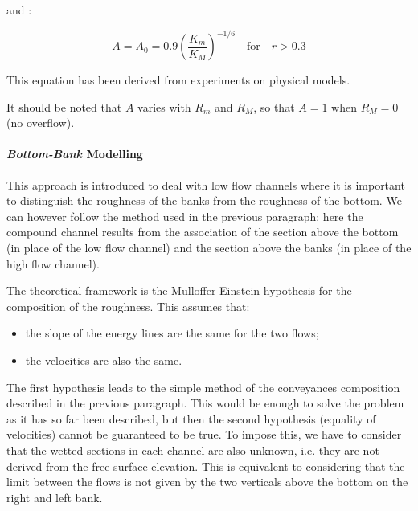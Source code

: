 and :

\begin{equation}
  A = A_0 = 0.9 \left ( \frac{K_m}{K_M} \right )^{-1/6} \quad \mbox{for} \quad r > 0.3
\end{equation}

\vspace{0.5cm}

This equation has been derived from experiments on physical models.

\vspace{0.5cm}

It should be noted that $A$ varies with $R_m$ and $R_M$, so that $A = 1$ when $R_M = 0$ (no overflow).

\paragraph{\emph{Bottom-Bank} Modelling\\}

\hspace*{1cm}

This approach is introduced to deal with low flow channels where it is important to distinguish the roughness of the banks from the roughness of the bottom. We can however follow the method used in the previous paragraph: here the compound channel results from the association of the section above the bottom (in place of the low flow channel) and the section above the banks (in place of the high flow channel).

\vspace{0.5cm}

The theoretical framework is the Mulloffer-Einstein hypothesis \cite{NICOLLET79} for the composition of the roughness. This assumes that:
\begin{itemize}
 \item the slope of the energy lines are the same for the two flows;
 \item the velocities are also the same.
\end{itemize}

\vspace{0.5cm}

The first hypothesis leads to the simple method of the conveyances composition described in the previous paragraph. This would be enough to solve the problem as it has so far been described, but then the second hypothesis (equality of velocities) cannot be guaranteed to be true. To impose this, we have to consider that the wetted sections in each channel are also unknown, i.e. they are not derived from the free surface elevation. This is equivalent to considering that the limit between the flows is not given by the two verticals above the bottom on the right and left bank.

